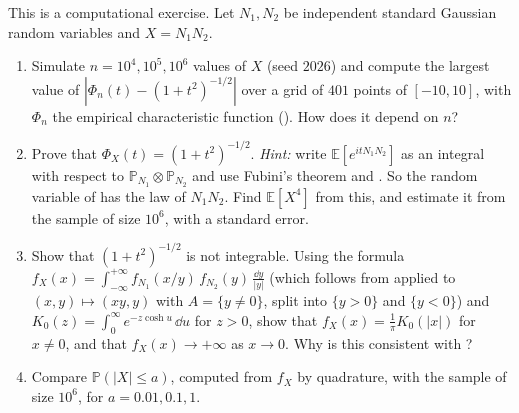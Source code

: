 \begin{exercise}\label{ex:cf-product-normals}
\medium This is a computational exercise. Let $N_1,N_2$ be independent standard Gaussian random
variables and $X=N_1N_2$.
\begin{enumerate}[label=(\alph*)]
  \item Simulate $n=10^4,10^5,10^6$ values of $X$ (seed $2026$) and compute the largest value of
    $|\Phi_n(t)-(1+t^2)^{-1/2}|$ over a grid of $401$ points of $[-10,10]$, with $\Phi_n$ the
    empirical characteristic function (). How does it depend on $n$?
  \item Prove that $\Phi_X(t)=(1+t^2)^{-1/2}$. \emph{Hint:} write $\mathbb E[e^{itN_1N_2}]$ as an
    integral with respect to $\mathbb P_{N_1}\otimes\mathbb P_{N_2}$ and use Fubini's theorem and
    . So the random variable of  has the
    law of $N_1N_2$. Find $\mathbb E[X^4]$ from this, and estimate it from the sample of size
    $10^6$, with a standard error.
  \item Show that $(1+t^2)^{-1/2}$ is not integrable. Using the formula
    $f_X(x)=\int_{-\infty}^{+\infty}f_{N_1}(x/y)\,f_{N_2}(y)\,\frac{\dd y}{|y|}$ (which follows from
     applied to $(x,y)\mapsto(xy,y)$ with $A=\{y\ne0\}$, split into
    $\{y>0\}$ and $\{y<0\}$) and $K_0(z)=\int_0^\infty e^{-z\cosh u}\,\dd u$ for $z>0$, show that
    $f_X(x)=\frac1\pi K_0(|x|)$ for $x\ne0$, and that $f_X(x)\to+\infty$ as $x\to0$. Why is this
    consistent with ?
  \item Compare $\mathbb P(|X|\le a)$, computed from $f_X$ by quadrature, with the sample of size
    $10^6$, for $a=0.01,0.1,1$.
\end{enumerate}
\end{exercise}

